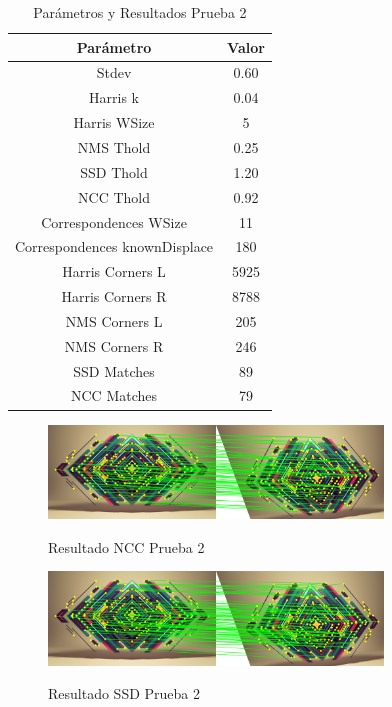 \documentclass{IEEEtran}
\begin{document}
\begin{table}[H]
\centering
\begin{tabular}{*2c}
\toprule
Parámetro & Valor \\ 
\midrule
Stdev & 0.60 \\
Harris k & 0.04 \\
Harris WSize & 5 \\
NMS Thold & 0.25 \\
SSD Thold & 1.20 \\
NCC Thold & 0.92 \\
Correspondences WSize & 11 \\
Correspondences knownDisplace & 180 \\
\hline
Harris Corners L & 5925 \\
Harris Corners R & 8788 \\
NMS Corners L & 205 \\
NMS Corners R & 246 \\
SSD Matches & 89 \\
NCC Matches & 79 \\
\bottomrule
\end{tabular}
\caption{Parámetros y Resultados Prueba 2}
\label{tb:test2}
\end{table}

\begin{figure}[H]
\caption{Resultado NCC Prueba 2}
\centering
\includegraphics[width=8.9cm,natwidth=1200,natheight=450]{figs/img2ncc.png}
\label{fig:test2ncc}
\end{figure}

\begin{figure}[H]
\caption{Resultado SSD Prueba 2}
\centering
\includegraphics[width=8.9cm,natwidth=1200,natheight=450]{figs/img2ssd.png}
\label{fig:test2ssd}
\end{figure}
\end{document}
